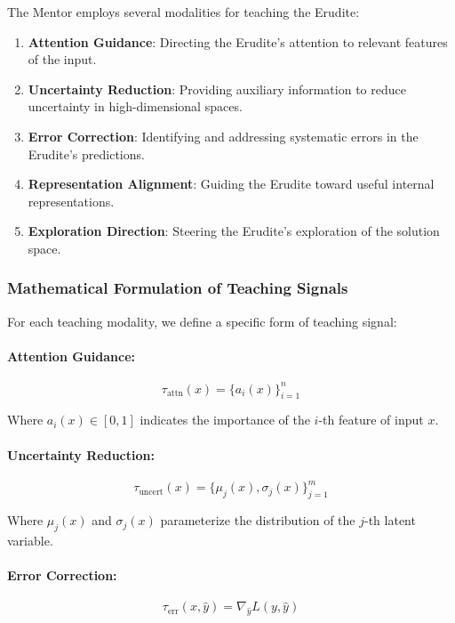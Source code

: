 The Mentor employs several modalities for teaching the Erudite:

\begin{enumerate}
\item \textbf{Attention Guidance}: Directing the Erudite's attention to relevant features of the input.

\item \textbf{Uncertainty Reduction}: Providing auxiliary information to reduce uncertainty in high-dimensional spaces.

\item \textbf{Error Correction}: Identifying and addressing systematic errors in the Erudite's predictions.

\item \textbf{Representation Alignment}: Guiding the Erudite toward useful internal representations.

\item \textbf{Exploration Direction}: Steering the Erudite's exploration of the solution space.
\end{enumerate}

\subsubsection{Mathematical Formulation of Teaching Signals}

For each teaching modality, we define a specific form of teaching signal:

\paragraph{Attention Guidance:}
\begin{equation}
\tau_{\text{attn}}(x) = \{a_i(x)\}_{i=1}^n
\end{equation}

Where $a_i(x) \in [0,1]$ indicates the importance of the $i$-th feature of input $x$.

\paragraph{Uncertainty Reduction:}
\begin{equation}
\tau_{\text{uncert}}(x) = \{\mu_j(x), \sigma_j(x)\}_{j=1}^m
\end{equation}

Where $\mu_j(x)$ and $\sigma_j(x)$ parameterize the distribution of the $j$-th latent variable.

\paragraph{Error Correction:}
\begin{equation}
\tau_{\text{err}}(x, \hat{y}) = \nabla_{\hat{y}} L(y, \hat{y})
\end{equation}

